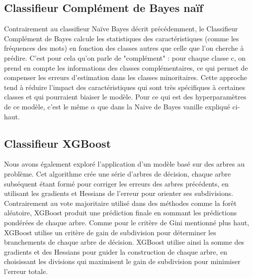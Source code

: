 \documentclass{article}
\begin{document}
\subsection{Classifieur Complément de Bayes naïf}
Contrairement au classifieur Naïve Bayes décrit précédemment, le Classifieur Complément de Bayes calcule les statistiques des caractéristiques (comme les fréquences des mots) en fonction des classes autres que celle que l’on cherche à prédire. C'est pour cela qu'on parle de "complément" : pour chaque classe c, on prend en compte les informations des classes complémentaires, ce qui permet de compenser les erreurs d’estimation dans les classes minoritaires. Cette approche tend à réduire l’impact des caractéristiques qui sont très spécifiques à certaines classes et qui pourraient biaiser le modèle. Pour ce qui est des hyperparamètres de ce modèle, c'est le même $\alpha$ que dans la Naive de Bayes vanille expliqué ci-haut.
\subsection{Classifieur XGBoost}
Nous avons également exploré l’application d’un modèle basé sur des arbres au problème. Cet algorithme crée une série d'arbres de décision, chaque arbre subséquent étant formé pour corriger les erreurs des arbres précédents, en utilisant les gradients et Hessians de l’erreur pour orienter ses subdivisions. Contrairement au vote majoritaire utilisé dans des méthodes comme la forêt aléatoire, XGBoost produit une prédiction finale en sommant les prédictions pondérées de chaque arbre. Comme pour le critère de Gini mentionné plus haut, XGBoost utilise un critère de gain de subdivision pour déterminer les branchements de chaque arbre de décision. 
XGBoost utilise ainsi la somme des gradients et des Hessians pour guider la construction de chaque arbre, en choisissant les divisions qui maximisent le gain de subdivision pour minimiser l’erreur totale.  
\end{document}
